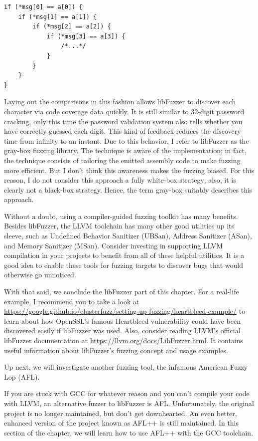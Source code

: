 \begin{lstlisting}[style=styleCXX]
if (*msg[0] == a[0]) {
	if (*msg[1] == a[1]) {
		if (*msg[2] == a[2]) {
			if (*msg[3] == a[3]) {
				/*...*/
			}
		}
	}
}
\end{lstlisting}

Laying out the comparisons in this fashion allows libFuzzer to discover each character via code coverage data quickly. It is still similar to 32-digit password cracking, only this time the password validation system also tells whether you have correctly guessed each digit. This kind of feedback reduces the discovery time from infinity to an instant. Due to this behavior, I refer to libFuzzer as the gray-box fuzzing library. The technique is aware of the implementation; in fact, the technique consists of tailoring the emitted assembly code to make fuzzing more efficient. But I don't think this awareness makes the fuzzing biased. For this reason, I do not consider this approach a fully white-box strategy; also, it is clearly not a black-box strategy. Hence, the term gray-box suitably describes this approach. 

Without a doubt, using a compiler-guided fuzzing toolkit has many benefits. Besides libFuzzer, the LLVM toolchain has many other good utilities up its sleeve, such as Undefined Behavior Sanitizer (UBSan), Address Sanitizer (ASan), and Memory Sanitizer (MSan). Consider investing in supporting LLVM compilation in your projects to benefit from all of these helpful utilities. It is a good idea to enable these tools for fuzzing targets to discover bugs that would otherwise go unnoticed.

With that said, we conclude the libFuzzer part of this chapter. For a real-life example, I
recommend you to take a look at \url{https://google.github.io/clusterfuzz/setting-up-fuzzing/heartbleed-example/} to learn about how OpenSSL's famous Heartbleed vulnerability could have been discovered easily if libFuzzer was used. Also, consider reading LLVM's official libFuzzer documentation at \url{https://llvm.org/docs/LibFuzzer.html}. It contains useful information about libFuzzer's fuzzing concept and usage examples.

Up next, we will investigate another fuzzing tool, the infamous American Fuzzy Lop (AFL).


If you are stuck with GCC for whatever reason and you can't compile your code with LLVM, an alternative fuzzer to libFuzzer is AFL. Unfortunately, the original project is no longer maintained, but don't get downhearted. An even better, enhanced version of the project known as AFL++ is still maintained. In this section of the chapter, we will learn how to use AFL++ with the GCC toolchain.

